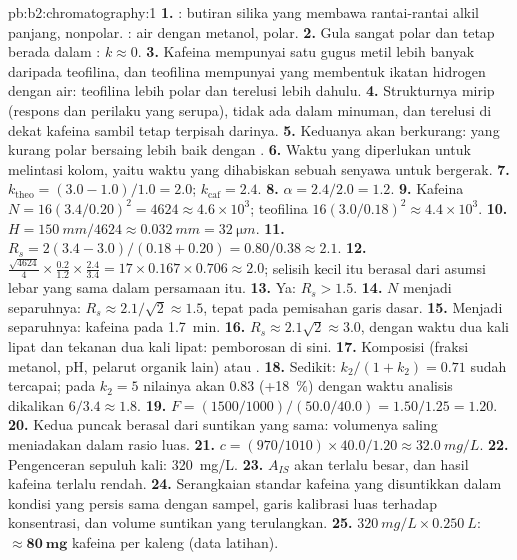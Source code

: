 \begin{solution}{pb:b2:chromatography:1}
\textbf{1.} : butiran silika yang membawa rantai-rantai alkil
panjang, nonpolar. : air dengan metanol, polar.
\textbf{2.} Gula sangat polar dan tetap berada dalam : $k \approx 0$.
\textbf{3.} Kafeina mempunyai satu gugus metil lebih banyak daripada
teofilina, dan teofilina mempunyai  yang membentuk ikatan hidrogen
dengan air: teofilina lebih polar dan terelusi lebih dahulu.
\textbf{4.} Strukturnya mirip (respons dan perilaku yang serupa), tidak ada
dalam minuman, dan terelusi di dekat kafeina sambil tetap terpisah darinya.
\textbf{5.} Keduanya akan berkurang:  yang kurang polar bersaing
lebih baik dengan .
\textbf{6.} Waktu yang diperlukan  untuk melintasi kolom, yaitu
waktu yang dihabiskan sebuah senyawa untuk bergerak.
\textbf{7.} $k_{\mathrm{theo}} = (3.0 - 1.0)/1.0 = 2.0$; $k_{\mathrm{caf}} = 2.4$.
\textbf{8.} $\alpha = 2.4/2.0 = 1.2$.
\textbf{9.} Kafeina $N = 16(3.4/0.20)^2 = 4624 \approx 4.6 \times 10^3$; teofilina $16(3.0/0.18)^2
\approx 4.4 \times 10^3$.
\textbf{10.} $H = \qty{150}{mm}/4624 \approx \qty{0.032}{mm} = \qty{32}{\micro m}$.
\textbf{11.} $R_s = 2(3.4 - 3.0)/(0.18 + 0.20) = 0.80/0.38 \approx 2.1$.
\textbf{12.} $\frac{\sqrt{4624}}{4} \times \frac{0.2}{1.2} \times \frac{2.4}{3.4} = 17 \times 0.167 \times
0.706 \approx 2.0$; selisih kecil itu berasal dari asumsi lebar yang sama
dalam persamaan itu.
\textbf{13.} Ya: $R_s > 1.5$.
\textbf{14.} $N$ menjadi separuhnya: $R_s \approx 2.1/\sqrt2 \approx 1.5$, tepat pada pemisahan garis dasar.
\textbf{15.} Menjadi separuhnya: kafeina pada \qty{1.7}{min}.
\textbf{16.} $R_s \approx 2.1\sqrt2 \approx 3.0$, dengan waktu dua kali lipat
dan tekanan dua kali lipat: pemborosan di sini.
\textbf{17.} Komposisi  (fraksi metanol, pH, pelarut organik lain)
atau .
\textbf{18.} Sedikit: $k_2/(1 + k_2) = 0.71$ sudah tercapai; pada $k_2 = 5$
nilainya akan 0.83 (+18~\%) dengan waktu analisis dikalikan $6/3.4 \approx 1.8$.
\textbf{19.} $F = (1500/1000)/(50.0/40.0) = 1.50/1.25 = 1.20$.
\textbf{20.} Kedua puncak berasal dari suntikan yang sama: volumenya saling
meniadakan dalam rasio luas.
\textbf{21.} $c = (970/1010) \times 40.0/1.20 \approx \qty{32.0}{mg/L}$.
\textbf{22.} Pengenceran sepuluh kali: \qty{320}{mg/L}.
\textbf{23.} $A_{IS}$ akan terlalu besar, dan hasil kafeina terlalu rendah.
\textbf{24.} Serangkaian standar kafeina yang disuntikkan dalam kondisi yang
persis sama dengan sampel, garis kalibrasi luas terhadap konsentrasi, dan
volume suntikan yang terulangkan.
\textbf{25.} $\qty{320}{mg/L} \times \qty{0.250}{L}$: $\boldsymbol{\approx \qty{80}{mg}}$ kafeina per kaleng (data
latihan).
\end{solution}
